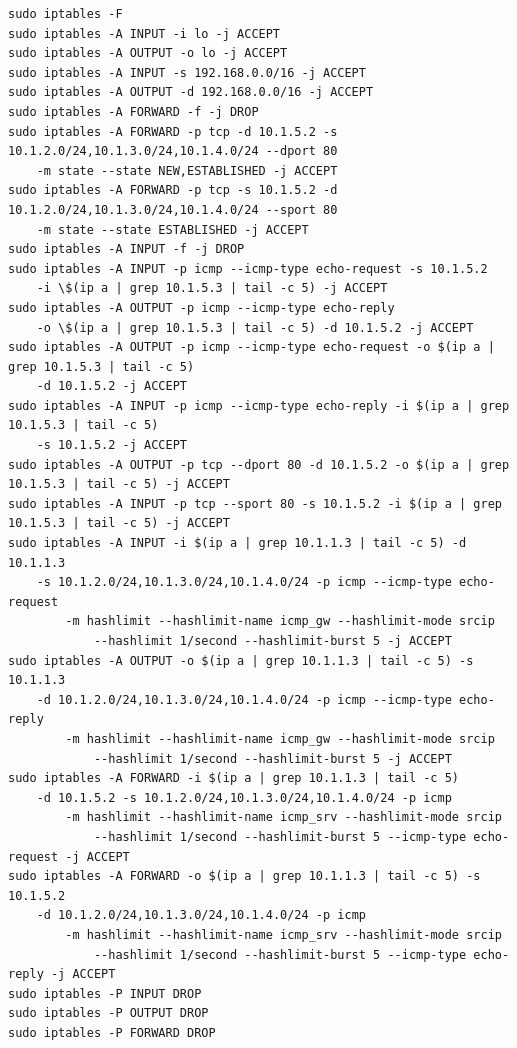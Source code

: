 \documentclass[14pt]{article}
\begin{document}
\begin{Verbatim}
sudo iptables -F
sudo iptables -A INPUT -i lo -j ACCEPT
sudo iptables -A OUTPUT -o lo -j ACCEPT
sudo iptables -A INPUT -s 192.168.0.0/16 -j ACCEPT
sudo iptables -A OUTPUT -d 192.168.0.0/16 -j ACCEPT
sudo iptables -A FORWARD -f -j DROP
sudo iptables -A FORWARD -p tcp -d 10.1.5.2 -s 10.1.2.0/24,10.1.3.0/24,10.1.4.0/24 --dport 80 
	-m state --state NEW,ESTABLISHED -j ACCEPT
sudo iptables -A FORWARD -p tcp -s 10.1.5.2 -d 10.1.2.0/24,10.1.3.0/24,10.1.4.0/24 --sport 80 
	-m state --state ESTABLISHED -j ACCEPT
sudo iptables -A INPUT -f -j DROP
sudo iptables -A INPUT -p icmp --icmp-type echo-request -s 10.1.5.2 
	-i \$(ip a | grep 10.1.5.3 | tail -c 5) -j ACCEPT
sudo iptables -A OUTPUT -p icmp --icmp-type echo-reply 
	-o \$(ip a | grep 10.1.5.3 | tail -c 5) -d 10.1.5.2 -j ACCEPT
sudo iptables -A OUTPUT -p icmp --icmp-type echo-request -o $(ip a | grep 10.1.5.3 | tail -c 5) 
	-d 10.1.5.2 -j ACCEPT
sudo iptables -A INPUT -p icmp --icmp-type echo-reply -i $(ip a | grep 10.1.5.3 | tail -c 5) 
	-s 10.1.5.2 -j ACCEPT
sudo iptables -A OUTPUT -p tcp --dport 80 -d 10.1.5.2 -o $(ip a | grep 10.1.5.3 | tail -c 5) -j ACCEPT
sudo iptables -A INPUT -p tcp --sport 80 -s 10.1.5.2 -i $(ip a | grep 10.1.5.3 | tail -c 5) -j ACCEPT
sudo iptables -A INPUT -i $(ip a | grep 10.1.1.3 | tail -c 5) -d 10.1.1.3 
	-s 10.1.2.0/24,10.1.3.0/24,10.1.4.0/24 -p icmp --icmp-type echo-request 
		-m hashlimit --hashlimit-name icmp_gw --hashlimit-mode srcip 
			--hashlimit 1/second --hashlimit-burst 5 -j ACCEPT
sudo iptables -A OUTPUT -o $(ip a | grep 10.1.1.3 | tail -c 5) -s 10.1.1.3 
	-d 10.1.2.0/24,10.1.3.0/24,10.1.4.0/24 -p icmp --icmp-type echo-reply 
		-m hashlimit --hashlimit-name icmp_gw --hashlimit-mode srcip 
			--hashlimit 1/second --hashlimit-burst 5 -j ACCEPT
sudo iptables -A FORWARD -i $(ip a | grep 10.1.1.3 | tail -c 5) 
	-d 10.1.5.2 -s 10.1.2.0/24,10.1.3.0/24,10.1.4.0/24 -p icmp 
		-m hashlimit --hashlimit-name icmp_srv --hashlimit-mode srcip 
			--hashlimit 1/second --hashlimit-burst 5 --icmp-type echo-request -j ACCEPT
sudo iptables -A FORWARD -o $(ip a | grep 10.1.1.3 | tail -c 5) -s 10.1.5.2 
	-d 10.1.2.0/24,10.1.3.0/24,10.1.4.0/24 -p icmp 
		-m hashlimit --hashlimit-name icmp_srv --hashlimit-mode srcip 
			--hashlimit 1/second --hashlimit-burst 5 --icmp-type echo-reply -j ACCEPT
sudo iptables -P INPUT DROP
sudo iptables -P OUTPUT DROP
sudo iptables -P FORWARD DROP
\end{Verbatim}
\end{document}
